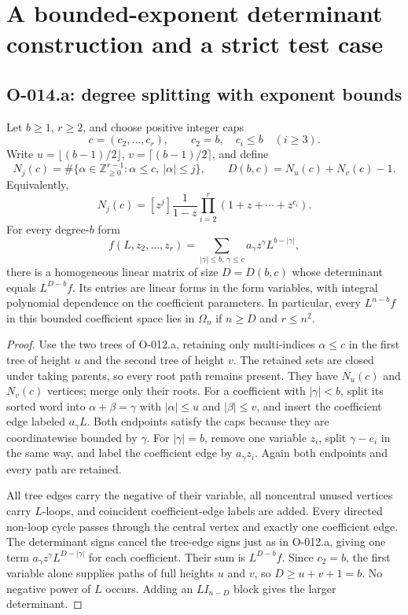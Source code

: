 \section{A bounded-exponent determinant construction and a strict test case}

\subsection{O-014.a: degree splitting with exponent bounds}
Let $b\geq1$, $r\geq2$, and choose positive integer caps
\[
             c=(c_2,\ldots,c_r),\qquad c_2=b,
                    \quad c_i\leq b\quad(i\geq3).
\]
Write $u=\lfloor(b-1)/2\rfloor$, $v=\lceil(b-1)/2\rceil$,
and define
\[
 N_j(c)=\#\{\alpha\in\mathbb Z_{\geq0}^{r-1}:
                         \alpha\leq c,\ |\alpha|\leq j\},
 \qquad D(b,c)=N_u(c)+N_v(c)-1.                         \tag{O-014.1}
\]
Equivalently,
\[
 N_j(c)=[z^j]\frac{1}{1-z}\prod_{i=2}^r
                                      (1+z+\cdots+z^{c_i}).
\]
For every degree-$b$ form
\[
 f(L,z_2,\ldots,z_r)=
       \sum_{|\gamma|\leq b,\,\gamma\leq c}
                          a_\gamma z^\gamma L^{b-|\gamma|},
\]
there is a homogeneous linear matrix of size $D=D(b,c)$
whose determinant equals $L^{D-b}f$. Its entries are linear
forms in the form variables, with integral polynomial dependence
on the coefficient parameters.
In particular, every $L^{n-b}f$ in this bounded coefficient
space lies in $\Omega_n$ if $n\geq D$ and $r\leq n^2$.

\begin{proof}
Use the two trees of O-012.a, retaining only multi-indices
$\alpha\leq c$ in the first tree of height $u$ and the second
tree of height $v$. The retained sets are closed under taking
parents, so every root path remains present. They have $N_u(c)$
and $N_v(c)$ vertices; merge only their roots.
For a coefficient with $|\gamma|<b$, split its sorted word
into $\alpha+\beta=\gamma$ with $|\alpha|\leq u$ and
$|\beta|\leq v$, and insert the coefficient edge labeled
$a_\gamma L$. Both endpoints satisfy the caps because they
are coordinatewise bounded by $\gamma$. For $|\gamma|=b$,
remove one variable $z_i$, split $\gamma-e_i$ in the same
way, and label the coefficient edge by $a_\gamma z_i$.
Again both endpoints and every path are retained.

All tree edges carry the negative of their variable, all
noncentral unused vertices carry $L$-loops, and coincident
coefficient-edge labels are added. Every directed non-loop
cycle passes through the central vertex and exactly one
coefficient edge. The determinant signs cancel the tree-edge
signs just as in O-012.a, giving one term
$a_\gamma z^\gamma L^{D-|\gamma|}$ for each coefficient.
Their sum is $L^{D-b}f$. Since $c_2=b$, the first variable
alone supplies paths of full heights $u$ and $v$, so
$D\geq u+v+1=b$. No negative power of $L$ occurs.
Adding an $L I_{n-D}$ block gives the larger determinant.
\end{proof}

